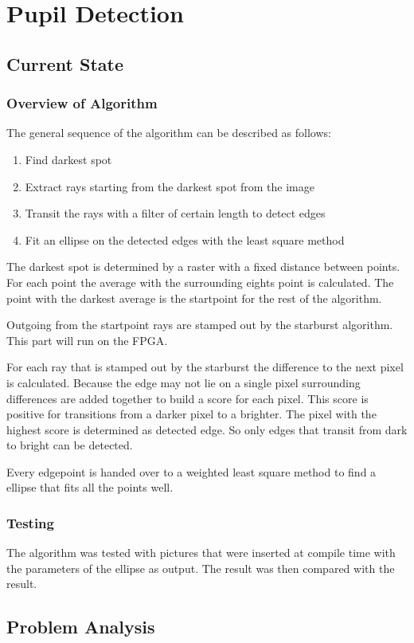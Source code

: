 \chapter{Pupil Detection}
\label{chap:pupildetection}
\section{Current State}
\label{sec:current}
\subsection{Overview of Algorithm}
The general sequence of the algorithm can be described as follows:
\begin{enumerate}
	\item Find darkest spot
	\item Extract rays  starting from the darkest spot from the image
	\item Transit the rays with a filter of certain length to detect edges
	\item Fit an ellipse on the detected edges with the least square method
\end{enumerate}
The darkest spot is determined by a raster with a fixed distance between points. For each point the average with the surrounding eights point is calculated. The point with the darkest average is the startpoint for the rest of the algorithm.

Outgoing from the startpoint rays are stamped out by the starburst algorithm. This part will run on the FPGA. 

For each ray that is stamped out by the starburst the difference to the next pixel is calculated. Because the edge may not lie on a single pixel surrounding differences are added together to build a score for each pixel. This score is positive for transitions from a darker pixel to a brighter. The pixel with the highest score is determined as detected edge. So only edges that transit from dark to bright can be detected.

Every edgepoint is handed over to a weighted least square method to find a ellipse that fits all the points well.
\subsection{Testing}
The algorithm was tested with pictures that were inserted at compile time with the parameters of the ellipse as output. The result was then compared with the result.
\section{Problem Analysis}
